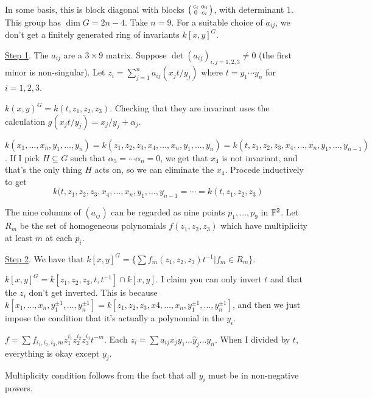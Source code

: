 In some basis, this is block diagonal with blocks $\bigl(\begin{smallmatrix} c_i& \alpha_i\\ 0 & c_i \end{smallmatrix}\bigr)$, with determinant 1. This group has $\dim G=2n-4$. Take $n=9$. For a suitable choice of $a_{ij}$, we don't get a finitely generated ring of invariants $k[x,y]^G$.

\underline{Step 1}. The $a_{ij}$ are a $3\times 9$ matrix. Suppose $\det (a_{ij})_{i,j=1,2,3}\neq 0$ (the first minor is non-singular). Let $z_i = \sum_{j=1}^n a_{ij} (x_jt/y_j)$ where $t=y_1\cdots y_n$ for $i=1,2,3$.

$k(x,y)^G=k(t,z_1,z_2,z_3)$. Checking that they are invariant uses the calculation $g(x_jt/y_j)=x_j/y_j+\alpha_j$.

$k(x_1,\dots, x_n,y_1,\dots, y_n)=k(z_1,z_2,z_3,x_4,\dots, x_n,y_1,\dots, y_n) = k(t,z_1,z_2,z_3,x_4,\dots, x_n,y_1,\dots, y_{n-1})$. If I pick $H\subseteq G$ such that $\alpha_5=\cdots \alpha_n=0$, we get that $x_4$ is not invariant, and that's the only thing $H$ acts on, so we can eliminate the $x_4$. Procede inductively to get
\[
 k(t,z_1,z_2,z_3,x_4,\dots, x_n,y_1,\dots, y_{n-1} = \cdots = k(t,z_1,z_2,z_3)
\]

The nine columns of $(a_{ij})$ can be regarded as nine points $p_1,\dots, p_9$ in $\mathbb{P}^2$. Let $R_m$ be the set of homogeneous polynomials $f(z_1,z_2,z_3)$ which have multiplicity at least $m$ at each $p_i$.

\underline{Step 2}. We have that $k[x,y]^G = \{\sum f_m(z_1,z_2,z_3)t^{-1}|f_m\in R_m\}$.

$k[x,y]^G = k[z_1,z_2,z_3,t,t^{-1}]\cap k[x,y]$. I claim you can only invert $t$ and that the $z_i$ don't get inverted. This is because $k[x_1,\dots, x_n,y_1^{\pm 1},\dots, y_n^{\pm 1}]=k[z_1,z_2,z_3,x4,\dots, x_n,y_1^{\pm 1},\dots, y_n^{\pm 1}]$, and then we just impose the condition that it's actually a polynomial in the $y_i$.

$f=\sum f_{i_1,i_2,i_3,m} z_1^{i_1}z_2^{i_2}z_3^{i_3}t^{-m}$. Each $z_i = \sum a_{ij}x_j y_1\dots \hat y_j\dots y_n$. When I divided by $t$, everything is okay except $y_j$.

Multiplicity condition follows from the fact that all $y_i$ must be in non-negative powers.

